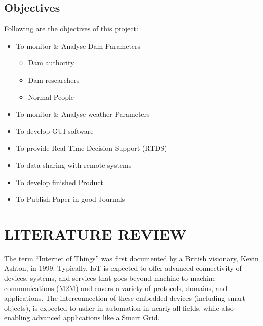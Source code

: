 \documentclass[a4paper,12pt]{report}
\begin{document}
\section{Objectives}
Following are the objectives of this project:
\begin{itemize}
 \item To monitor \& Analyse Dam Parameters
 \begin{itemize}
  \item Dam authority
  \item Dam researchers
  \item Normal People
 \end{itemize}
 \item To monitor \& Analyse weather Parameters
 \item To develop GUI software
 \item To provide Real Time Decision Support (RTDS)
 \item To data sharing with remote systems
 \item To develop finished Product
 \item To Publish Paper in good Journals 
\end{itemize}







\chapter{LITERATURE REVIEW}
\label{CH:literature_review}

The term “Internet of Things” was first documented by a British visionary, Kevin Ashton, in 1999.
Typically, IoT is expected to offer advanced connectivity of devices, systems, and services that goes beyond 
machine-to-machine communications (M2M) and covers a variety of protocols, domains, and applications.
The interconnection of these embedded devices (including smart objects), is expected to usher in automation in nearly all fields, 
while also enabling advanced applications like a Smart Grid. 
\cite{rfid:iot}
\newline
\end{document}
